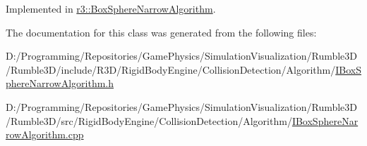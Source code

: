 Implemented in \mbox{\hyperlink{classr3_1_1_box_sphere_narrow_algorithm_a2fc345fdec27e85f0e569afa0d500865}{r3\+::\+Box\+Sphere\+Narrow\+Algorithm}}.



The documentation for this class was generated from the following files\+:\begin{DoxyCompactItemize}
\item 
D\+:/\+Programming/\+Repositories/\+Game\+Physics/\+Simulation\+Visualization/\+Rumble3\+D/\+Rumble3\+D/include/\+R3\+D/\+Rigid\+Body\+Engine/\+Collision\+Detection/\+Algorithm/\mbox{\hyperlink{_i_box_sphere_narrow_algorithm_8h}{I\+Box\+Sphere\+Narrow\+Algorithm.\+h}}\item 
D\+:/\+Programming/\+Repositories/\+Game\+Physics/\+Simulation\+Visualization/\+Rumble3\+D/\+Rumble3\+D/src/\+Rigid\+Body\+Engine/\+Collision\+Detection/\+Algorithm/\mbox{\hyperlink{_i_box_sphere_narrow_algorithm_8cpp}{I\+Box\+Sphere\+Narrow\+Algorithm.\+cpp}}\end{DoxyCompactItemize}
